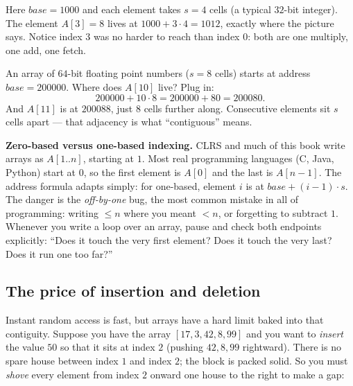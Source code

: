 Here $base = 1000$ and each element takes $s = 4$ cells (a typical $32$-bit integer). The element $A[3] = 8$ lives at $1000 + 3 \cdot 4 = 1012$, exactly where the picture says. Notice index $3$ was no harder to reach than index $0$: both are one multiply, one add, one fetch.

\begin{example}
\label{ch10:ex-addr}
An array of $64$-bit floating point numbers ($s = 8$ cells) starts at address $base = 200000$. Where does $A[10]$ live? Plug in:
\[
  200000 + 10 \cdot 8 = 200000 + 80 = 200080.
\]
And $A[11]$ is at $200088$, just $8$ cells further along. Consecutive elements sit $s$ cells apart --- that adjacency is what ``contiguous'' means.
\end{example}

\begin{trapbox}
\textbf{Zero-based versus one-based indexing.} CLRS and much of this book write arrays as $A[1..n]$, starting at $1$. Most real programming languages (C, Java, Python) start at $0$, so the first element is $A[0]$ and the last is $A[n-1]$. The address formula adapts simply: for one-based, element $i$ is at $base + (i-1)\cdot s$. The danger is the \emph{off-by-one} bug, the most common mistake in all of programming: writing $\le n$ where you meant $< n$, or forgetting to subtract $1$. Whenever you write a loop over an array, pause and check both endpoints explicitly: ``Does it touch the very first element? Does it touch the very last? Does it run one too far?''
\end{trapbox}

\subsection{The price of insertion and deletion}

Instant random access is fast, but arrays have a hard limit baked into that contiguity. Suppose you have the array $[17, 3, 42, 8, 99]$ and you want to \emph{insert} the value $50$ so that it sits at index $2$ (pushing $42, 8, 99$ rightward). There is no spare house between index $1$ and index $2$; the block is packed solid. So you must \emph{shove} every element from index $2$ onward one house to the right to make a gap:

\begin{center}
\end{center}

